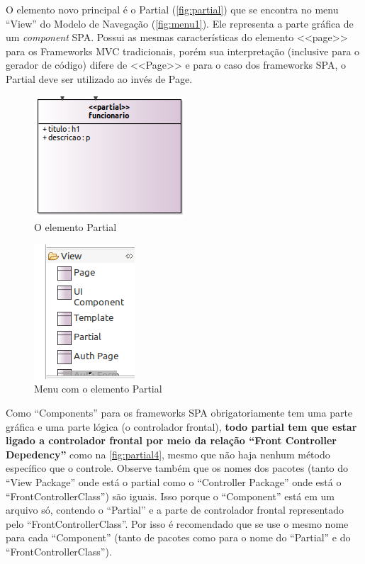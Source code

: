 \documentclass[
article,			%
11pt,				%
oneside,			%
a4paper,			%
english,			%
brazil,				%
sumario=tradicional
]{abntex2}
\begin{document}
O elemento novo principal é o Partial (\autoref{fig:partial}) que se encontra no menu ``View'' do Modelo de Navegação (\autoref{fig:menu1}). Ele representa a parte gráfica de um \textit{component} SPA. Possui as mesmas características do elemento <<page>> para os Frameworks MVC tradicionais, porém sua interpretação (inclusive para o gerador de código) difere de <<Page>> e para o caso dos frameworks SPA, o Partial deve ser utilizado ao invés de Page.

\begin{figure}
	\centering
	\includegraphics[width=0.4\linewidth]{figuras/Partial}
	\caption{O elemento Partial}
	\label{fig:partial}
\end{figure}

\begin{figure}
	\centering
	\includegraphics[width=0.3\linewidth]{figuras/menu1}
	\caption{Menu com o elemento Partial}
	\label{fig:menu1}
\end{figure}

Como ``Components'' para os frameworks SPA obrigatoriamente tem uma parte gráfica e uma parte lógica (o controlador frontal), \textbf{todo partial tem que estar ligado a controlador frontal por meio da relação ``Front Controller Depedency''} como na \autoref{fig:partial4}, mesmo que não haja nenhum método específico que o controle. Observe também que os nomes dos pacotes (tanto do ``View Package'' onde está o partial como o ``Controller Package'' onde está o ``FrontControllerClass'') são iguais. Isso porque o ``Component'' está em um arquivo só, contendo o ``Partial'' e a parte de controlador frontal representado pelo ``FrontControllerClass''. Por isso é recomendado que se use o mesmo nome para cada ``Component'' (tanto de pacotes como para o nome do ``Partial'' e do ``FrontControllerClass'').
\end{document}
